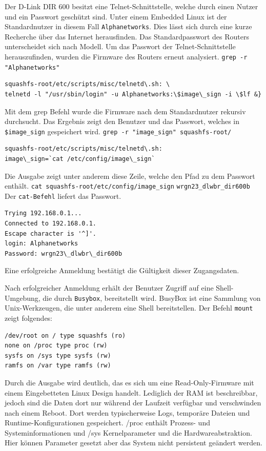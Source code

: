 	Der D-Link DIR 600 besitzt eine Telnet-Schnittstelle, welche durch einen Nutzer und ein Passwort
	geschützt sind. Unter einem Embedded Linux ist der Standardnutzer in diesem Fall \texttt{Alphanetworks}.
	Dies lässt sich durch eine kurze Recherche über das Internet herausfinden. Das Standardpasswort des Routers unterscheidet sich
	nach Modell. Um das Passwort der Telnet-Schnittstelle herauszufinden, wurden die Firmware des Routers
	erneut analysiert.
	\texttt{grep -r "Alphanetworks"}
\begin{lstlisting}[basicstyle=\ttfamily]
squashfs-root/etc/scripts/misc/telnetd\.sh: \
telnetd -l "/usr/sbin/login" -u Alphanetworks:\$image\_sign -i \$lf &}
\end{lstlisting}
	Mit dem grep Befehl wurde die Firmware nach dem Standardnutzer rekursiv durchsucht.
	Das Ergebnis zeigt den Benutzer und das Passwort, welches in \texttt{\$image\_sign} gespeichert wird.
	\texttt{grep -r "image\_sign" squashfs-root/}
\begin{lstlisting}
squashfs-root/etc/scripts/misc/telnetd\.sh:
image\_sign=`cat /etc/config/image\_sign`
\end{lstlisting}
	Die Ausgabe zeigt unter anderem diese Zeile, welche den Pfad zu dem Passwort enthält.
	\texttt{cat squashfs-root/etc/config/image\_sign}
	\texttt{wrgn23\_dlwbr\_dir600b}
Der \texttt{cat-Befehl} liefert das Passwort.
\begin{lstlisting}[basicstyle=\ttfamily]
Trying 192.168.0.1...
Connected to 192.168.0.1.
Escape character is '^]'.
login: Alphanetworks
Password: wrgn23\_dlwbr\_dir600b
\end{lstlisting}
	Eine erfolgreiche Anmeldung bestätigt die Gültigkeit dieser Zugangsdaten.
	
	Nach erfolgreicher Anmeldung erhält der Benutzer Zugriff auf eine Shell-Umgebung, die durch \texttt{Busybox}, 
	bereitstellt wird. BusyBox ist eine Sammlung von Unix-Werkzeugen, die unter anderem eine Shell bereitstellen. 
	Der Befehl \texttt{mount} zeigt folgendes:
\begin{lstlisting}[basicstyle=\ttfamily]
/dev/root on / type squashfs (ro)
none on /proc type proc (rw)
sysfs on /sys type sysfs (rw)
ramfs on /var type ramfs (rw)
\end{lstlisting}
	Durch die Ausgabe wird deutlich, das es sich um eine Read-Only-Firmware mit einem Eingebetteten Linux Design handelt.
	Lediglich der RAM ist beschreibbar, jedoch sind die Daten dort nur während der Laufzeit verfügbar und verschwinden nach einem Reboot.
	Dort werden typischerweise Logs, temporäre Dateien und Runtime-Konfigurationen gespeichert.
	/proc enthält Prozess- und Systeminformationen und /sys Kernelparameter und die Hardwareabstraktion.
	Hier können Parameter gesetzt aber das System nicht persistent geändert werden.
	
